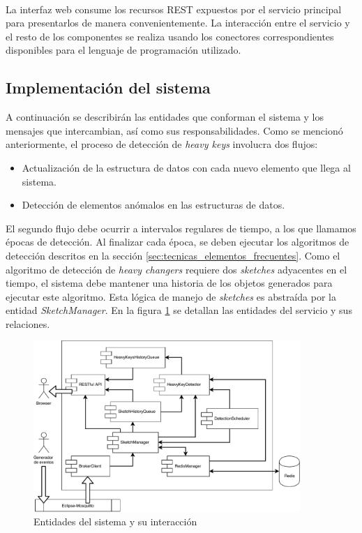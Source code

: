 \documentclass[a4paper,12pt, oneside]{article}
\begin{document}
\

La interfaz web consume los recursos REST expuestos por el servicio principal para presentarlos de manera convenientemente. La interacción entre el servicio y el resto de los componentes se realiza usando los conectores correspondientes disponibles para el lenguaje de programación utilizado.

\subsection{Implementación del sistema}\label{sec:implementacion_del_sistema}
A continuación se describirán las entidades que conforman el sistema y los mensajes que intercambian, así como sus responsabilidades. Como se mencionó anteriormente, el proceso de detección de \textit{heavy keys} involucra dos flujos:
\begin{itemize}
	\item Actualización de la estructura de datos con cada nuevo elemento que llega al sistema.
	\item Detección de elementos anómalos en las estructuras de datos. 
\end{itemize}

El segundo flujo debe ocurrir a intervalos regulares de tiempo, a los que llamamos épocas de detección. Al finalizar cada época, se deben ejecutar los algoritmos de detección descritos en la sección \ref{sec:tecnicas_elementos_frecuentes}. Como el algoritmo de detección de \textit{heavy changers} requiere dos \textit{sketches} adyacentes en el tiempo, el sistema debe mantener una historia de los objetos generados para ejecutar este algoritmo. Esta lógica de manejo de \textit{sketches} es abstraída por la entidad \textit{SketchManager}. En la figura \ref{fig:system_components} se detallan las entidades del servicio y sus relaciones.
 
\begin{figure}[h]
	\centering
	\includegraphics[width=0.9\textwidth]{./graph/system_components.pdf}
	\caption{Entidades del sistema y su interacción}
	\label{fig:system_components}
\end{figure}
\end{document}
